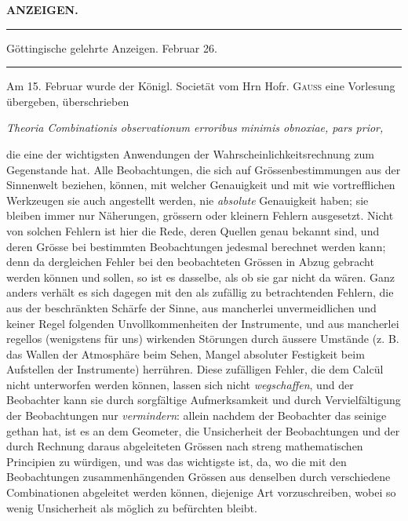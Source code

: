 \clearpage
{}
\begin{center}
{\Large\bfseries ANZEIGEN.}\par
\vspace{1.8em}
\rule{.88\textwidth}{.3pt}\par
Göttingische gelehrte Anzeigen. Februar 26.\par
\rule{.88\textwidth}{.3pt}
\end{center}

Am 15. Februar wurde der Königl. Societät vom Hrn Hofr. \textsc{Gauss} eine Vorlesung übergeben, überschrieben
\begin{center}
\textit{Theoria Combinationis observationum erroribus minimis obnoxiae, pars prior,}
\end{center}
\noindent die eine der wichtigsten Anwendungen der Wahrscheinlichkeitsrechnung zum Gegenstande hat. Alle Beobachtungen, die sich auf Grössenbestimmungen aus der Sinnenwelt beziehen, können, mit welcher Genauigkeit und mit wie vortrefflichen Werkzeugen sie auch angestellt werden, nie \textit{absolute} Genauigkeit haben; sie bleiben immer nur Näherungen, grössern oder kleinern Fehlern ausgesetzt. Nicht von solchen Fehlern ist hier die Rede, deren Quellen genau bekannt sind, und deren Grösse bei bestimmten Beobachtungen jedesmal berechnet werden kann; denn da dergleichen Fehler bei den beobachteten Grössen in Abzug gebracht werden können und sollen, so ist es dasselbe, als ob sie gar nicht da wären. Ganz anders verhält es sich dagegen mit den als zufällig zu betrachtenden Fehlern, die aus der beschränkten Schärfe der Sinne, aus mancherlei unvermeidlichen und keiner Regel folgenden Unvollkommenheiten der Instrumente, und aus mancherlei regellos (wenigstens für uns) wirkenden Störungen durch äussere Umstände (z. B. das Wallen der Atmosphäre beim Sehen, Mangel absoluter Festigkeit beim Aufstellen der Instrumente) herrühren. Diese zufälligen Fehler, die
dem Calcül nicht unterworfen werden können, lassen sich nicht \textit{wegschaffen}, und der Beobachter kann sie durch sorgfältige Aufmerksamkeit und durch Vervielfältigung der Beobachtungen nur \textit{vermindern}: allein nachdem der Beobachter das seinige gethan hat, ist es an dem Geometer, die Unsicherheit der Beobachtungen und der durch Rechnung daraus abgeleiteten Grössen nach streng mathematischen Principien zu würdigen, und was das wichtigste ist, da, wo die mit den Beobachtungen zusammenhängenden Grössen aus denselben durch verschiedene Combinationen abgeleitet werden können, diejenige Art vorzuschreiben, wobei so wenig Unsicherheit als möglich zu befürchten bleibt.


